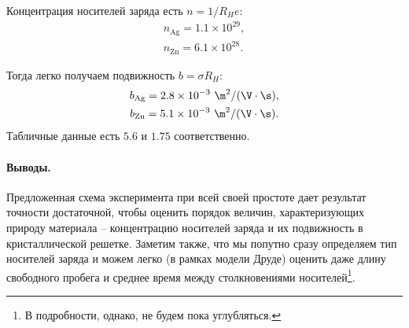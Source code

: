 \documentclass{../lab_class}
\begin{document}
Концентрация носителей заряда есть $n = 1/R_He$:
\begin{gather*}
	n_{\text{Ag}} = 1.1 \times 10^29,\\
	n_{\text{Zn}} = 6.1 \times 10^28.
\end{gather*}

Тогда легко получаем подвижность $b = \sigma R_H$:
\begin{gather*}
	b_{\text{Ag}} = 2.8 \times 10^{-3} \ \m^2 / (\V \cdot \s), \\
	b_{\text{Zn}} = 5.1 \times 10^{-3} \ \m^2 / (\V \cdot \s).	
\end{gather*}
Табличные данные есть $5.6$ и $1.75$ соответственно.

\paragraph{Выводы.}
Предложенная схема эксперимента при всей своей простоте дает результат точности достаточной, чтобы оценить порядок величин, характеризующих природу материала -- концентрацию носителей заряда и их подвижность в кристаллической решетке. Заметим также, что мы попутно сразу определяем тип носителей заряда и можем легко (в рамках модели Друде) оценить даже длину свободного пробега и среднее время между столкновениями носителей\footnote{В подробности, однако, не будем пока углубляться.}. 
\end{document}
